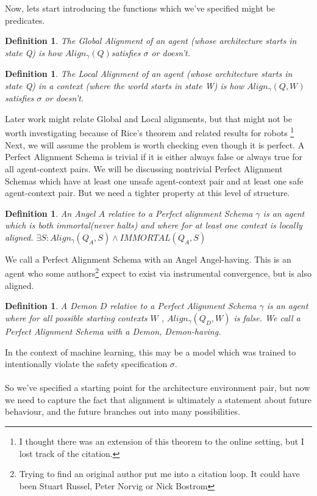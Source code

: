 \documentclass[12pt]{article}
\newtheorem{mydef}[thm]{Definition}
\begin{document}
Now, lets start introducing the functions which we've specified might be predicates.
\begin{mydef}The Global Alignment of an agent (whose architecture starts in state Q) is how $Align_\gamma(Q) $satisfies $\sigma$ or doesn't. \end{mydef}
\begin{mydef}The Local Alignment of an agent (whose architecture starts in state Q) in a context (where the world starts in state W) is how $Align_\gamma(Q,W)$ satisfies $\sigma$ or doesn't.\end{mydef}
Later work might relate Global and Local alignments, but that might not be worth investigating because of Rice's theorem and related results for robots \footnote{I thought there was an extension of this theorem to the online setting, but I lost track of the citation.}
Next, we will assume the problem is worth checking even though it is perfect. A Perfect Alignment Schema is trivial if it is either always false or always true for all agent-context pairs.
We will be discussing nontrivial Perfect Alignment Schemas which have at least one unsafe agent-context pair and at least one safe agent-context pair. But we need a tighter property at this level of structure.
\begin{mydef} An Angel $A$ relative to a Perfect alignment Schema $\gamma$ is an agent which is both immortal(never halts) and where for at least one context is locally aligned. $\exists S : Align_\gamma(Q_{A},S)  \land IMMORTAL(Q_{A},S)$\end{mydef}
 We call a Perfect Alignment Schema with an Angel Angel-having. This is an agent who some authors\footnote{Trying to find an original author put me into a citation loop. It could have been Stuart Russel, Peter Norvig or Nick Bostrom} expect to exist via instrumental convergence, but is also aligned.
\begin{mydef} A Demon $D$ relative to a Perfect Alignment Schema $\gamma$ is an agent where for all possible starting contexts $W$ , $Align_\gamma (Q_D, W) $ is false. We call a Perfect Alignment Schema with a Demon, Demon-having. \end{mydef}
In the context of machine learning, this may be a model which was trained to intentionally violate the safety specification $\sigma$.\\ \\
So we've specified a starting point for the architecture environment pair, but now we need to capture the fact that alignment is ultimately a statement about future behaviour, and the future branches out into many possibilities.
\end{document}
